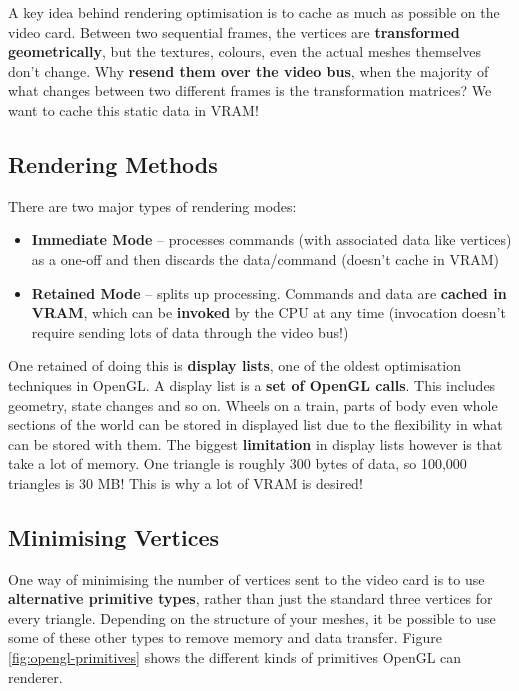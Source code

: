 \documentclass{article}
\begin{document}
A key idea behind rendering optimisation is to cache as much as possible on the video card. Between two sequential frames, the vertices are \textbf{transformed geometrically}, but the textures, colours, even the actual meshes themselves don't change. Why \textbf{resend them over the video bus}, when the majority of what changes between two different frames is the transformation matrices? We want to cache this static data in VRAM!

\subsection{Rendering Methods}

There are two major types of rendering modes:
\begin{itemize}
	\item \textbf{Immediate Mode} -- processes commands (with associated data like vertices) as a one-off and then discards the data/command (doesn't cache in VRAM)
	\item \textbf{Retained Mode} -- splits up processing. Commands and data are \textbf{cached in VRAM}, which can be \textbf{invoked} by the CPU at any time (invocation doesn't require sending lots of data through the video bus!)
\end{itemize}

One retained of doing this is \textbf{display lists}, one of the oldest optimisation techniques in OpenGL. A display list is a \textbf{set of OpenGL calls}. This includes geometry, state changes and so on. Wheels on a train, parts of body even whole sections of the world can be stored in displayed list due to the flexibility in what can be stored with them. The biggest \textbf{limitation} in display lists however is that take a lot of memory. One triangle is roughly 300 bytes of data, so 100,000 triangles is 30 MB! This is why a lot of VRAM is desired!

\subsection{Minimising Vertices}

One way of minimising the number of vertices sent to the video card is to use \textbf{alternative primitive types}, rather than just the standard three vertices for every triangle. Depending on the structure of your meshes, it be possible to use some of these other types to remove memory and data transfer. Figure \ref{fig:opengl-primitives} shows the different kinds of primitives OpenGL can renderer.
\end{document}
